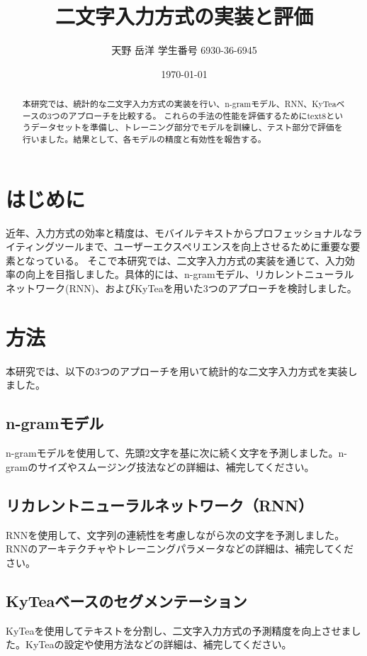 \documentclass[12pt]{article}
\title{二文字入力方式の実装と評価}
\author{天野 岳洋 学生番号 6930-36-6945}
\date{\today}
\begin{document}
\maketitle

\begin{abstract}
本研究では、統計的な二文字入力方式の実装を行い、n-gramモデル、RNN、KyTeaベースの3つのアプローチを比較する。
これらの手法の性能を評価するためにtext8というデータセットを準備し、トレーニング部分でモデルを訓練し、テスト部分で評価を行いました。結果として、各モデルの精度と有効性を報告する。
\end{abstract}

\section{はじめに}
近年、入力方式の効率と精度は、モバイルテキストからプロフェッショナルなライティングツールまで、ユーザーエクスペリエンスを向上させるために重要な要素となっている。
そこで本研究では、二文字入力方式の実装を通じて、入力効率の向上を目指しました。具体的には、n-gramモデル、リカレントニューラルネットワーク(RNN)、およびKyTeaを用いた3つのアプローチを検討しました。


\section{方法}
本研究では、以下の3つのアプローチを用いて統計的な二文字入力方式を実装しました。

\subsection{n-gramモデル}
n-gramモデルを使用して、先頭2文字を基に次に続く文字を予測しました。n-gramのサイズやスムージング技法などの詳細は、補完してください。

\subsection{リカレントニューラルネットワーク（RNN）}
RNNを使用して、文字列の連続性を考慮しながら次の文字を予測しました。RNNのアーキテクチャやトレーニングパラメータなどの詳細は、補完してください。

\subsection{KyTeaベースのセグメンテーション}
KyTeaを使用してテキストを分割し、二文字入力方式の予測精度を向上させました。KyTeaの設定や使用方法などの詳細は、補完してください。
\end{document}
